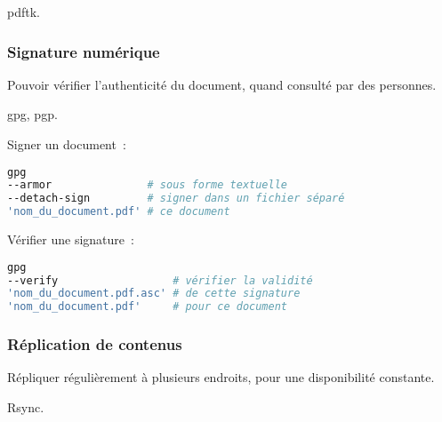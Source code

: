 \gls{pdftk}.

\subsubsection{Signature numérique}

Pouvoir vérifier l’authenticité du document, quand consulté par des personnes.

\gls{gpg}, \gls{pgp}.

Signer un document :
\begin{lstlisting}[language=sh]
gpg
--armor               # sous forme textuelle
--detach-sign         # signer dans un fichier séparé
'nom_du_document.pdf' # ce document
\end{lstlisting}

Vérifier une signature :
\begin{lstlisting}[language=sh]
gpg
--verify                  # vérifier la validité
'nom_du_document.pdf.asc' # de cette signature
'nom_du_document.pdf'     # pour ce document
\end{lstlisting}

\subsubsection{Réplication de contenus}

Répliquer régulièrement à plusieurs endroits, pour une disponibilité constante.

Rsync.

\pagebreak
